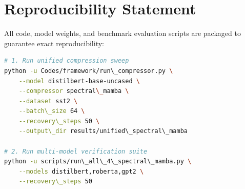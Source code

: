 \section{Reproducibility Statement}
All code, model weights, and benchmark evaluation scripts are packaged to guarantee exact reproducibility:
\begin{lstlisting}[language=bash]
# 1. Run unified compression sweep
python -u Codes/framework/run\_compressor.py \
    --model distilbert-base-uncased \
    --compressor spectral\_mamba \
    --dataset sst2 \
    --batch\_size 64 \
    --recovery\_steps 50 \
    --output\_dir results/unified\_spectral\_mamba

# 2. Run multi-model verification suite
python -u scripts/run\_all\_4\_spectral\_mamba.py \
    --models distilbert,roberta,gpt2 \
    --recovery\_steps 50
\end{lstlisting}
